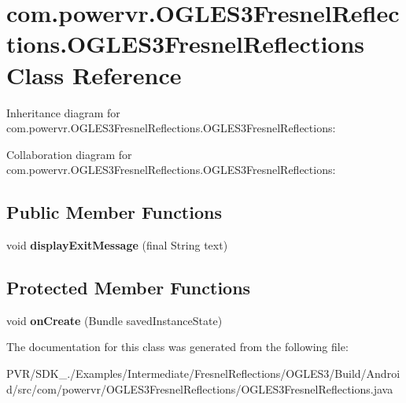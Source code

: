 \hypertarget{classcom_1_1powervr_1_1_o_g_l_e_s3_fresnel_reflections_1_1_o_g_l_e_s3_fresnel_reflections}{\section{com.\+powervr.\+O\+G\+L\+E\+S3\+Fresnel\+Reflections.\+O\+G\+L\+E\+S3\+Fresnel\+Reflections Class Reference}
\label{classcom_1_1powervr_1_1_o_g_l_e_s3_fresnel_reflections_1_1_o_g_l_e_s3_fresnel_reflections}
}


Inheritance diagram for com.\+powervr.\+O\+G\+L\+E\+S3\+Fresnel\+Reflections.\+O\+G\+L\+E\+S3\+Fresnel\+Reflections\+:


Collaboration diagram for com.\+powervr.\+O\+G\+L\+E\+S3\+Fresnel\+Reflections.\+O\+G\+L\+E\+S3\+Fresnel\+Reflections\+:
\subsection*{Public Member Functions}
\begin{DoxyCompactItemize}
\item 
\hypertarget{classcom_1_1powervr_1_1_o_g_l_e_s3_fresnel_reflections_1_1_o_g_l_e_s3_fresnel_reflections_a810c75a692e6e40ae00f1ad0972e6440}{void {\bfseries display\+Exit\+Message} (final String text)}\label{classcom_1_1powervr_1_1_o_g_l_e_s3_fresnel_reflections_1_1_o_g_l_e_s3_fresnel_reflections_a810c75a692e6e40ae00f1ad0972e6440}

\end{DoxyCompactItemize}
\subsection*{Protected Member Functions}
\begin{DoxyCompactItemize}
\item 
\hypertarget{classcom_1_1powervr_1_1_o_g_l_e_s3_fresnel_reflections_1_1_o_g_l_e_s3_fresnel_reflections_a31dbd58bf9f9ac78edcb393f6acc2a20}{void {\bfseries on\+Create} (Bundle saved\+Instance\+State)}\label{classcom_1_1powervr_1_1_o_g_l_e_s3_fresnel_reflections_1_1_o_g_l_e_s3_fresnel_reflections_a31dbd58bf9f9ac78edcb393f6acc2a20}

\end{DoxyCompactItemize}


The documentation for this class was generated from the following file\+:\begin{DoxyCompactItemize}
\item 
P\+V\+R/\+S\+D\+K\+\_./\+Examples/\+Intermediate/\+Fresnel\+Reflections/\+O\+G\+L\+E\+S3/\+Build/\+Android/src/com/powervr/\+O\+G\+L\+E\+S3\+Fresnel\+Reflections/O\+G\+L\+E\+S3\+Fresnel\+Reflections.\+java\end{DoxyCompactItemize}
